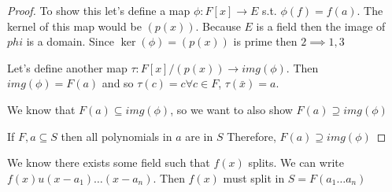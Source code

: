 
\begin{proof}
    To show this let's define a map \(\phi: F[x] \to E\) s.t. \(\phi(f) = f(a)\). The kernel of this map would be \((p(x))\). Because \(E\) is a field then the image of \(phi\) is a domain. Since \(\ker(\phi) = (p(x))\) is prime then \(2 \implies 1, 3\)
    
    Let's define another map \(\tau: F[x]/(p(x)) \to img(\phi)\). Then \(img(\phi) = F(a)\) and so \(\tau(c) = c \forall c \in F\), \(\tau(\bar{x}) = a\).
    
    We know that \(F(a) \subseteq img(\phi)\), so we want to also show \(F(a) \supseteq img(\phi)\) 
    
    If \(F, a \subseteq S\) then all polynomials in \(a\) are in \(S\) Therefore, \(F(a) \supseteq img(\phi)\)  
\end{proof}



\begin{theorem}
    \label{thm:existence of splitting field}
    We know there exists some field such that \(f(x)\) splits. We can write \(f(x) u(x-a_1)\ldots (x-a_n)\). Then \(f(x)\) must split in \(S = F(a_1\ldots a_n)\) 
\end{theorem}


